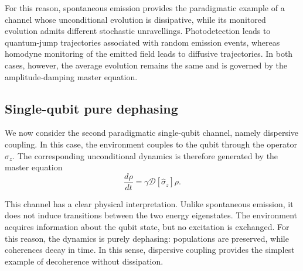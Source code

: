 For this reason, spontaneous emission provides the paradigmatic example of a channel whose unconditional evolution is dissipative, while its monitored evolution admits different stochastic unravellings. Photodetection leads to quantum-jump trajectories associated with random emission events, whereas homodyne monitoring of the emitted field leads to diffusive trajectories. In both cases, however, the average evolution remains the same and is governed by the amplitude-damping master equation.

\subsection{Single-qubit pure dephasing}
\label{subsec:single_qubit_dispersive_coupling}

We now consider the second paradigmatic single-qubit channel, namely dispersive coupling. In this case, the environment couples to the qubit through the operator \(\hat \sigma_z\). The corresponding unconditional dynamics is therefore generated by the master equation
\begin{equation}
	\frac{d\rho}{dt}
	=
	\gamma \mathcal{D}[\hat \sigma_z]\rho.
	\label{eq:single_qubit_dephasing_master_equation}
\end{equation}

This channel has a clear physical interpretation. Unlike spontaneous emission, it does not induce transitions between the two energy eigenstates. The environment acquires information about the qubit state, but no excitation is exchanged. For this reason, the dynamics is purely dephasing: populations are preserved, while coherences decay in time. In this sense, dispersive coupling provides the simplest example of decoherence without dissipation.


